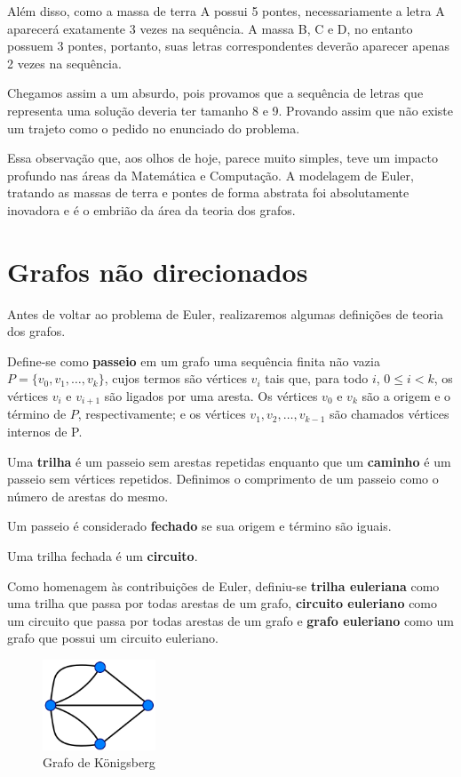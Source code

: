Além disso, como a massa de terra A possui 5 pontes, necessariamente a letra A aparecerá exatamente 3 vezes na sequência.
A massa B, C e D, no entanto possuem 3 pontes, portanto, suas letras correspondentes deverão aparecer apenas 2 vezes na sequência. 

Chegamos assim a um absurdo, pois provamos que a sequência de letras que representa uma solução deveria ter tamanho 8 e 9.
Provando assim que não existe um trajeto como o pedido no enunciado do problema.

Essa observação que, aos olhos de hoje, parece muito simples, teve um impacto profundo nas áreas da Matemática e Computação.
A modelagem de Euler, tratando as massas de terra e pontes de forma abstrata foi absolutamente inovadora e é o embrião da área da teoria dos grafos.

\section{Grafos não direcionados}

Antes de voltar ao problema de Euler, realizaremos algumas definições de teoria dos grafos.

Define-se como \textbf{passeio} em um grafo uma sequência finita não vazia $P = \{ v_0, v_1, \dots, v_k\}$, cujos termos são vértices $v_i$ tais que, para todo $i$, $0 \leq i < k$, os vértices $v_{i}$ e $v_{i+1}$ são ligados por uma aresta. 
Os vértices $v_0$ e $v_k$ são a origem e o término de $P$, respectivamente; e os vértices $v_1, v_2, \dots, v_{k-1}$ são chamados vértices internos de P. 

Uma \textbf{trilha} é um passeio sem arestas repetidas enquanto que um \textbf{caminho} é um passeio sem vértices repetidos.
Definimos o comprimento de um passeio como o número de arestas do mesmo.

Um passeio é considerado \textbf{fechado} se sua origem e término são iguais.

Uma trilha fechada é um \textbf{circuito}.

Como homenagem às contribuições de Euler, definiu-se \textbf{trilha euleriana} como uma trilha que passa por todas arestas de um grafo, \textbf{circuito euleriano} como um circuito que passa por todas arestas de um grafo e \textbf{grafo euleriano} como um grafo que possui um circuito euleriano.

\begin{figure}
    \centering
    \includegraphics[width=0.3\textwidth]{konigsberg-graph.png}
    \caption{Grafo de Königsberg}
    \label{konigsberg-graph}
\end{figure}

